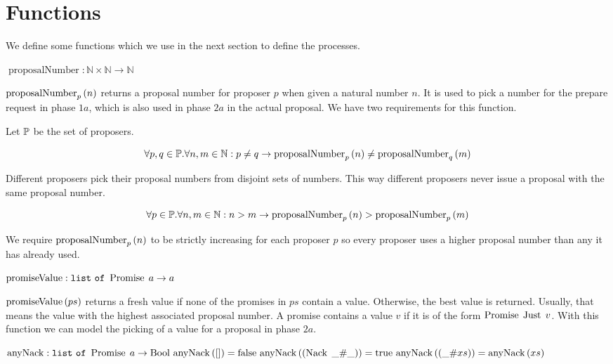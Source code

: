 \section{Functions}
We define some functions which we use in the next section to define the processes.

$\operatorname{proposalNumber} : \mathbb{N} \times \mathbb{N} \to \mathbb{N}$

$\proposalNumber{n}{p}$ returns a proposal number for proposer $p$ when given a natural number $n$.
It is used to pick a number for the prepare request in phase $1a$, which is also used in phase $2a$ in the actual proposal.
We have two requirements for this function.

Let $\SetOfProposers$ be the set of proposers.

\[\forall p,q \in \SetOfProposers . \forall n,m \in \mathbb{N}: p \neq q \to \proposalNumber{n}{p} \neq \proposalNumber{m}{q}\]

Different proposers pick their proposal numbers from disjoint sets of numbers.
This way different proposers never issue a proposal with the same proposal number.

\[\forall p \in \SetOfProposers . \forall n,m \in \mathbb{N}: n > m \to \proposalNumber{n}{p} > \proposalNumber{m}{p}\]

We require $\proposalNumber{n}{p}$ to be strictly increasing for each proposer $p$ so every proposer uses a higher proposal number than any it has already used.


$\operatorname{promiseValue} : \List{\Promise{a}} \to a$

$\promiseValue{ps}$ returns a fresh value if none of the promises in $ps$ contain a value. Otherwise, the best value is returned. Usually, that means the value with the highest associated proposal number.
A promise contains a value $v$ if it is of the form $\Promise{\Just{v}}$.
With this function we can model the picking of a value for a proposal in phase $2a$.

$\operatorname{anyNack} : \List{\Promise{a}} \to \Bool\\
\anyNack{\EmptyList} = \False\\
\anyNack{\ListPattern{\Nack{\Wildcard}}{\Wildcard}} = \True\\
\anyNack{\ListPattern{\Wildcard}{xs}} = \anyNack{xs}$

